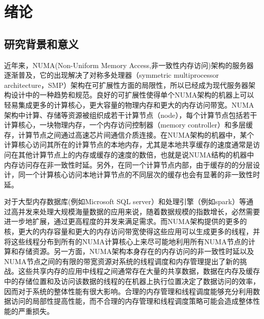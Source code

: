 
\chapter{绪论}
\label{chap:intro}


\section{研究背景和意义}
近年来，NUMA(Non-Uniform Memory Access,非一致性内存访问)\cite{feliu2012understanding}\cite{dashti2013traffic}架构的服务器逐渐普及，它的出现解决了对称多处理器（symmetric multiprocessor architecture，SMP）架构在可扩展性方面的局限性\cite{pusukuri2014shuffling}，所以已经成为现代服务器架构设计中的一种趋势和规范\cite{kashyap2017scalable}\cite{chabbi2016contention}\cite{chabbi2017efficient}。良好的可扩展性使得单个NUMA架构的机器上可以轻易集成更多的计算核心，更大容量的物理内存和更大的内存访问带宽。NUMA架构中计算、存储等资源被组织成若干计算节点（node），每个计算节点包括若干计算核心，一块物理内存，一个内存访问控制器（memory controller）和多层缓存，计算节点之间通过高速芯片间通信介质连接。在NUMA架构的机器中，某个计算核心访问其所在的计算节点的本地内存，尤其是本地共享缓存的速度通常是访问在其他计算节点上的内存或缓存的速度的数倍，也就是说NUMA结构的机器中内存访问存在非一致性时延。另外，在同一个计算节点内部，由于缓存的的分层设计，同一个计算核心访问本地计算节点的不同层次的缓存也会有显著的非一致性时延\cite{chabbi2015high}。

对于大型内存数据库(例如Microsoft SQL server）\cite{MICROSOFT-SQL}和处理引擎\cite{SAP}\cite{zaharia2010spark}（例如spark）等通过高并发来处理大规模海量数据的应用来说，随着数据规模的指数增长，必然需要进一步地扩展，通过更高程度的并发来满足需求。而NUMA架构提供的更多的核，更大的内存容量和更大的内存访问带宽使得这些应用可以生成更多的线程，并将这些线程分布到所有的NUMA计算核心上来尽可能地利用所有NUMA节点的计算和存储资源。另一方面，NUMA架构本身存在的内存访问的非一致性时延以及NUMA节点之间的有限的带宽资源对系统的线程调度和内存管理提出了新的挑战\cite{wang2012performance}\cite{boyd2008corey}。这些共享内存的应用中线程之间通常存在大量的共享数据，数据在内存及缓存中的存储位置和及访问该数据的线程的在机器上执行位置决定了数据访问的效率，因而对于系统的整体性能有很大影响。合理的内存管理和线程调度能够充分利用数据访问的局部性提高性能，而不合理的内存管理和线程调度策略可能会造成整体性能的严重损失。

